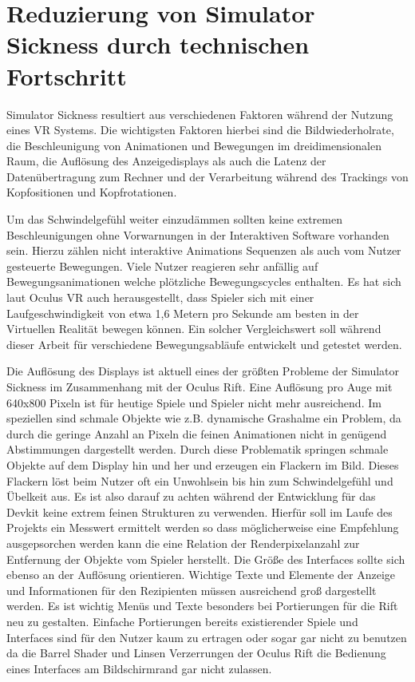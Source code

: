 \documentclass[pagesize, paper=a4, fontsize=12pt,titlepage=true, headings=small, headnosepline, abstractoff, liststotoc, nochapterprefix, plainheadsepline, twoside]{scrreprt}
\begin{document}
\section{Reduzierung von Simulator Sickness durch technischen Fortschritt}
Simulator Sickness resultiert aus verschiedenen Faktoren während der Nutzung eines VR Systems. Die wichtigsten Faktoren hierbei sind die Bildwiederholrate, die Beschleunigung von Animationen und Bewegungen im dreidimensionalen Raum, die Auflösung des Anzeigedisplays als auch die Latenz der Datenübertragung zum Rechner und der Verarbeitung während des Trackings von Kopfositionen und Kopfrotationen. 

Um das Schwindelgefühl weiter einzudämmen sollten keine extremen Beschleunigungen ohne Vorwarnungen in der Interaktiven Software vorhanden sein. Hierzu zählen nicht interaktive Animations Sequenzen als auch vom Nutzer gesteuerte Bewegungen. Viele Nutzer reagieren sehr anfällig auf Bewegungsanimationen welche plötzliche Bewegungscycles enthalten. Es hat sich laut Oculus VR auch herausgestellt, dass Spieler sich mit einer Laufgeschwindigkeit von etwa 1,6 Metern pro Sekunde am besten in der Virtuellen Realität bewegen können. Ein solcher Vergleichswert soll während dieser Arbeit für verschiedene Bewegungsabläufe entwickelt und getestet werden.

Die Auflösung des Displays ist aktuell eines der größten Probleme der Simulator Sickness im Zusammenhang mit der Oculus Rift.  Eine Auflösung pro Auge mit 640x800 Pixeln ist für heutige Spiele und Spieler nicht mehr ausreichend. Im speziellen sind schmale Objekte wie z.B. dynamische Grashalme ein Problem, da durch die geringe Anzahl an Pixeln die feinen Animationen nicht in genügend Abstimmungen dargestellt werden. Durch diese Problematik springen schmale Objekte auf dem Display hin und her und erzeugen ein Flackern im Bild. Dieses Flackern löst beim Nutzer oft ein Unwohlsein bis hin zum Schwindelgefühl und Übelkeit aus. Es ist also darauf zu achten während der Entwicklung für das Devkit keine extrem feinen Strukturen zu verwenden. Hierfür soll im Laufe des Projekts ein Messwert ermittelt werden so dass möglicherweise eine Empfehlung ausgepsorchen werden kann die eine Relation der Renderpixelanzahl zur Entfernung der Objekte vom Spieler herstellt. Die Größe des Interfaces sollte sich ebenso an der Auflösung orientieren. Wichtige Texte und Elemente der Anzeige und Informationen für den Rezipienten müssen ausreichend groß dargestellt werden. Es ist wichtig Menüs und Texte besonders bei Portierungen für die Rift neu zu gestalten. Einfache Portierungen bereits existierender Spiele und Interfaces sind für den Nutzer kaum zu ertragen oder sogar gar nicht zu benutzen da die Barrel Shader und Linsen Verzerrungen der Oculus Rift die Bedienung eines Interfaces am Bildschirmrand gar nicht zulassen.
\end{document}
